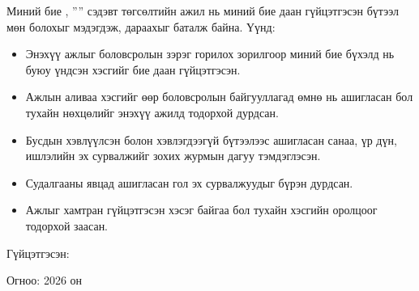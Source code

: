 \begin{declaration}
\addchaptertocentry{\authorshipname}

\noindent Миний бие \shortname, ''{\ttitle}'' сэдэвт төгсөлтийн ажил нь миний бие даан гүйцэтгэсэн бүтээл мөн болохыг мэдэгдэж, дараахыг баталж байна. Үүнд:

\begin{itemize}
\item Энэхүү ажлыг боловсролын зэрэг горилох зорилгоор миний бие бүхэлд нь буюу үндсэн хэсгийг бие даан гүйцэтгэсэн.
\item Ажлын аливаа хэсгийг өөр боловсролын байгууллагад өмнө нь ашигласан бол тухайн нөхцөлийг энэхүү ажилд тодорхой дурдсан.
\item Бусдын хэвлүүлсэн болон хэвлэгдээгүй бүтээлээс ашигласан санаа, үр дүн, ишлэлийн эх сурвалжийг зохих журмын дагуу тэмдэглэсэн.
\item Судалгааны явцад ашигласан гол эх сурвалжуудыг бүрэн дурдсан.
\item Ажлыг хамтран гүйцэтгэсэн хэсэг байгаа бол тухайн хэсгийн оролцоог тодорхой заасан.
\end{itemize}
\bigskip

\noindent Гүйцэтгэсэн: {\shortname}
\bigskip

\noindent Огноо: 2026 он

\end{declaration}

\clearpage
